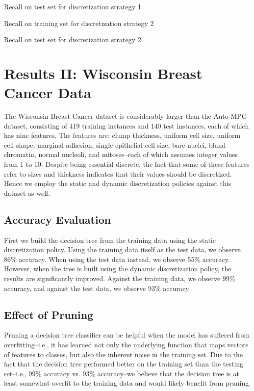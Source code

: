 \documentclass[12pt, conference, compsocconf]{IEEEtran}
\begin{document}
Recall on test set for discretization strategy 1

Recall on training set for discretization strategy 2

Recall on test set for discretization strategy 2

\section{Results II: Wisconsin Breast Cancer Data}
The Wisconsin Breast Cancer dataset is considerably larger than the Auto-MPG dataset, consisting of 419 training instances and 140 test instances, each of which has nine features. 
The features are: clump thickness, uniform cell size, uniform cell shape, marginal adhesion, single epithelial cell size, bare nuclei, bland chromatin, normal nucleoli, and mitoses--each of which assumes integer values from 1 to 10. 
Despite being essential discrete, the fact that some of these features refer to sizes and thickness indicates that their values should be discretized. Hence we employ the static and dynamic discretization policies against this dataset as well.

\subsection{Accuracy Evaluation}
First we build the decision tree from the training data using the static discretization policy. 
Using the training data itself as the test data, we observe 86\% accuracy.
When using the test data instead, we observe 55\% accuracy.
However, when the tree is built using the dynamic discretization policy, the results are significantly improved.
Against the training data, we observe 99\% accuracy, and against the test data, we observe 93\% accuracy


\subsection{Effect of Pruning}
Pruning a decision tree classifier can be helpful when the model has suffered from overfitting--i.e., it has learned not only the underlying function that maps vectors of features to classes, but also the inherent noise in the training set. 
Due to the fact that the decision tree performed better on the training set than the testing set--i.e., 99\% accuracy vs. 93\% accuracy--we believe that the decision tree is at least somewhat overfit to the training data and would likely benefit from pruning. 
\end{document}
